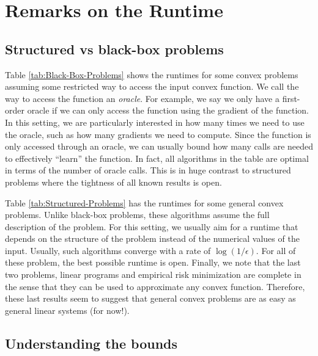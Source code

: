 \section{Remarks on the Runtime}

\subsection{Structured vs black-box problems}

Table \ref{tab:Black-Box-Problems} shows the runtimes for some convex
problems assuming some restricted way to access the input convex function.
We call the way to access the function an \emph{oracle}. For example,
we say we only have a first-order oracle if we can only access the
function using the gradient of the function. In this setting, we are
particularly interested in how many times we need to use the oracle,
such as how many gradients we need to compute. Since the function
is only accessed through an oracle, we can usually bound how many
calls are needed to effectively ``learn'' the function. In fact,
all algorithms in the table are optimal in terms of the number of
oracle calls. This is in huge contrast to structured problems where
the tightness of all known results is open.

Table \ref{tab:Structured-Problems} has the runtimes for some general
convex problems. Unlike black-box problems, these algorithms assume
the full description of the problem. For this setting, we usually
aim for a runtime that depends on the structure of the problem instead
of the numerical values of the input. Usually, such algorithms converge
with a rate of $\log(1/\epsilon)$. For all of these problem, the
best possible runtime is open. Finally, we note that the last two
problems, linear programs and empirical risk minimization are complete
in the sense that they can be used to approximate any convex function.
Therefore, these last results seem to suggest that general convex
problems are as easy as general linear systems (for now!).

\subsection{Understanding the bounds}

